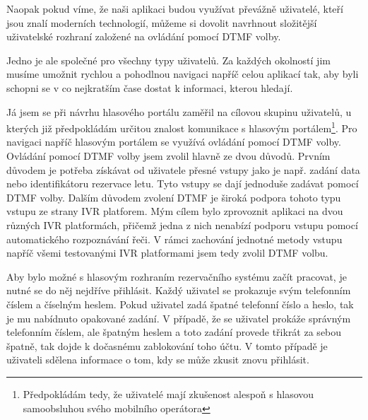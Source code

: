 \documentclass[ing,male,java,dept460]{diploma}						%
\begin{document}
Naopak pokud víme, že naši aplikaci budou využívat převážně uživatelé, kteří jsou znalí moderních technologií, můžeme si dovolit navrhnout složitější uživatelské rozhraní založené na ovládání pomocí DTMF volby.

Jedno je ale společné pro všechny typy uživatelů. Za každých okolností jim musíme umožnit rychlou a pohodlnou navigaci napříč celou aplikací tak, aby byli schopni se v co nejkratším čase dostat k informaci, kterou hledají.

Já jsem se při návrhu hlasového portálu zaměřil na cílovou skupinu uživatelů, u kterých již předpokládám určitou znalost komunikace s hlasovým portálem\footnote{Předpokládám tedy, že uživatelé mají zkušenost alespoň s hlasovou samoobsluhou svého mobilního operátora}. Pro navigaci napříč hlasovým portálem se využívá ovládání pomocí DTMF volby. Ovládání pomocí DTMF volby jsem zvolil hlavně ze dvou důvodů. Prvním důvodem je potřeba získávat od uživatele přesné vstupy jako je např. zadání data nebo identifikátoru rezervace letu. Tyto vstupy se dají jednoduše zadávat pomocí DTMF volby. Dalším důvodem zvolení DTMF je široká podpora tohoto typu vstupu ze strany IVR platforem. Mým cílem bylo zprovoznit aplikaci na dvou různých IVR platformách, přičemž jedna z nich nenabízí podporu vstupu pomocí automatického rozpoznávání řeči. V rámci zachování jednotné metody vstupu napříč všemi testovanými IVR platformami jsem tedy zvolil DTMF volbu.

Aby bylo možné s hlasovým rozhraním rezervačního systému začít pracovat, je nutné se do něj nejdříve přihlásit. Každý uživatel se prokazuje svým telefonním číslem a číselným heslem. Pokud uživatel zadá špatné telefonní číslo a heslo, tak je mu nabídnuto opakované zadání. V případě, že se uživatel prokáže správným telefonním číslem, ale špatným heslem a toto zadání provede třikrát za sebou špatně, tak dojde k dočasnému zablokování toho účtu. V tomto případě je uživateli sdělena informace o tom, kdy se může zkusit znovu přihlásit.

\end{document}
